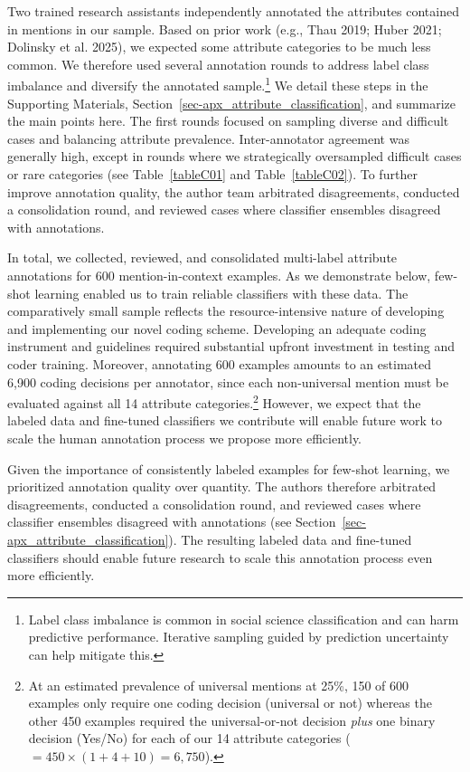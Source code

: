 \documentclass[12pt]{article}
\begin{document}
Two trained research assistants independently annotated the attributes contained in mentions in our sample.
Based on prior work (e.g., Thau 2019; Huber 2021; Dolinsky et al. 2025), we expected some attribute categories to be much less common.
We therefore used several annotation rounds to address label class imbalance and diversify the annotated sample.\footnote{Label class imbalance is common in social science classification and can harm predictive performance.
  Iterative sampling guided by prediction uncertainty can help mitigate this.}
We detail these steps in the Supporting Materials, Section~\ref{sec-apx_attribute_classification}, and summarize the main points here.
The first rounds focused on sampling diverse and difficult cases and balancing attribute prevalence.
Inter-annotator agreement was generally high, except in rounds where we strategically oversampled difficult cases or rare categories (see Table~\ref{tableC01} and Table~\ref{tableC02}).
To further improve annotation quality, the author team arbitrated disagreements, conducted a consolidation round, and reviewed cases where classifier ensembles disagreed with annotations.

In total, we collected, reviewed, and consolidated multi-label attribute annotations for 600 mention-in-context examples.
As we demonstrate below, few-shot learning enabled us to train reliable classifiers with these data.
The comparatively small sample reflects the resource-intensive nature of developing and implementing our novel coding scheme.
Developing an adequate coding instrument and guidelines required substantial upfront investment in testing and coder training. 
Moreover, annotating 600 examples amounts to an estimated 6,900 coding decisions per annotator, since each non-universal mention must be evaluated against all 14 attribute categories.\footnote{At an estimated prevalence of universal mentions at 25\%, 150 of 600 examples only require one coding decision (universal or not) whereas the other 450 examples required the universal-or-not decision \emph{plus} one binary decision (Yes/No) for each of our 14 attribute categories (\(=450 \times(1+4+10) = 6,750\)).}
However, we expect that the labeled data and fine-tuned classifiers we contribute will enable future work to scale the human annotation process we propose more efficiently.

Given the importance of consistently labeled examples for few-shot learning, we prioritized annotation quality over quantity.
The authors therefore arbitrated disagreements, conducted a consolidation round, and reviewed cases where classifier ensembles disagreed with annotations (see Section~\ref{sec-apx_attribute_classification}).
The resulting labeled data and fine-tuned classifiers should enable future research to scale this annotation process even more efficiently.
\end{document}
